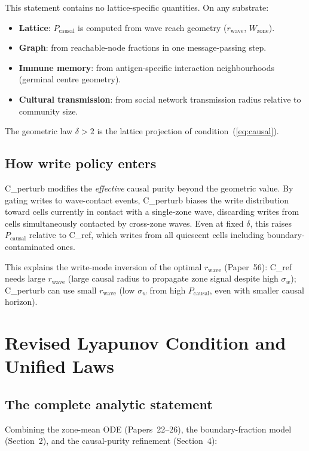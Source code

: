 \documentclass[11pt,a4paper]{article}
\newcommand{\sw}{\sigma_w}
\newcommand{\Pcausal}{P_{\mathrm{causal}}}
\begin{document}
This statement contains no lattice-specific quantities.
On any substrate:
\begin{itemize}
  \item \textbf{Lattice}: $\Pcausal$ is computed from wave reach geometry ($r_\mathrm{wave}$,
    $W_\mathrm{zone}$).
  \item \textbf{Graph}: from reachable-node fractions in one message-passing step.
  \item \textbf{Immune memory}: from antigen-specific interaction neighbourhoods
    (germinal centre geometry).
  \item \textbf{Cultural transmission}: from social network transmission radius
    relative to community size.
\end{itemize}
The geometric law $\delta > 2$ is the lattice projection of condition~(\ref{eq:causal}).

\subsection{How write policy enters}

C\_perturb modifies the \emph{effective} causal purity beyond the geometric value.
By gating writes to wave-contact events, C\_perturb biases the write distribution
toward cells currently in contact with a single-zone wave, discarding writes from
cells simultaneously contacted by cross-zone waves.
Even at fixed $\delta$, this raises $\Pcausal$ relative to C\_ref, which
writes from all quiescent cells including boundary-contaminated ones.

This explains the write-mode inversion of the optimal $r_\mathrm{wave}$
(Paper~56): C\_ref needs large $r_\mathrm{wave}$ (large causal radius to propagate
zone signal despite high $\sw$); C\_perturb can use small $r_\mathrm{wave}$ (low
$\sw$ from high $\Pcausal$, even with smaller causal horizon).

\section{Revised Lyapunov Condition and Unified Laws}

\subsection{The complete analytic statement}

Combining the zone-mean ODE (Papers~22--26), the boundary-fraction model
(Section~2), and the causal-purity refinement (Section~4):
\end{document}
